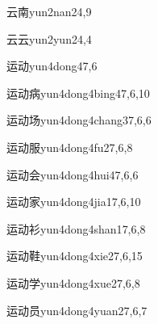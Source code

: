 \begin{entry}{云南}{yun2nan2}{4,9}
\end{entry}

\begin{entry}{云云}{yun2yun2}{4,4}
\end{entry}

\begin{entry}{运动}{yun4dong4}{7,6}
\end{entry}

\begin{entry}{运动病}{yun4dong4bing4}{7,6,10}
\end{entry}

\begin{entry}{运动场}{yun4dong4chang3}{7,6,6}
\end{entry}

\begin{entry}{运动服}{yun4dong4fu2}{7,6,8}
\end{entry}

\begin{entry}{运动会}{yun4dong4hui4}{7,6,6}
\end{entry}

\begin{entry}{运动家}{yun4dong4jia1}{7,6,10}
\end{entry}

\begin{entry}{运动衫}{yun4dong4shan1}{7,6,8}
\end{entry}

\begin{entry}{运动鞋}{yun4dong4xie2}{7,6,15}
\end{entry}

\begin{entry}{运动学}{yun4dong4xue2}{7,6,8}
\end{entry}

\begin{entry}{运动员}{yun4dong4yuan2}{7,6,7}
\end{entry}

